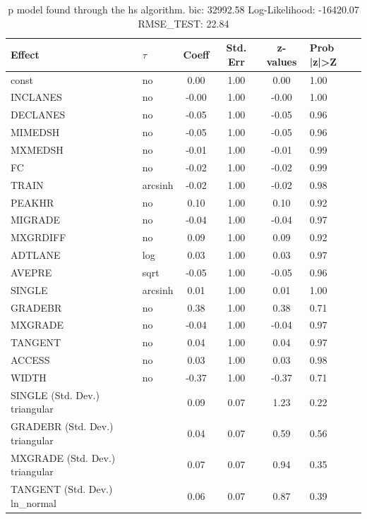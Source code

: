 \begin{table}
	\caption{p model found through the hs algorithm. bic: 32992.58 Log-Likelihood: -16420.07 RMSE_TEST: 22.84}
	\begin{center}
		\begin{tabular}{|l|l|c|c|c|l|}
			\hline
			Effect & $\tau$ & Coeff & Std. Err & z-values & Prob |z|>Z \\
			\hline
			const & no & 0.00 & 1.00 & 0.00 & 1.00 \\
			\hline
			INCLANES & no & -0.00 & 1.00 & -0.00 & 1.00 \\
			\hline
			DECLANES & no & -0.05 & 1.00 & -0.05 & 0.96 \\
			\hline
			MIMEDSH & no & -0.05 & 1.00 & -0.05 & 0.96 \\
			\hline
			MXMEDSH & no & -0.01 & 1.00 & -0.01 & 0.99 \\
			\hline
			FC & no & -0.02 & 1.00 & -0.02 & 0.99 \\
			\hline
			TRAIN & arcsinh & -0.02 & 1.00 & -0.02 & 0.98 \\
			\hline
			PEAKHR & no & 0.10 & 1.00 & 0.10 & 0.92 \\
			\hline
			MIGRADE & no & -0.04 & 1.00 & -0.04 & 0.97 \\
			\hline
			MXGRDIFF & no & 0.09 & 1.00 & 0.09 & 0.92 \\
			\hline
			ADTLANE & log & 0.03 & 1.00 & 0.03 & 0.97 \\
			\hline
			AVEPRE & sqrt & -0.05 & 1.00 & -0.05 & 0.96 \\
			\hline
			SINGLE & arcsinh & 0.01 & 1.00 & 0.01 & 1.00 \\
			\hline
			GRADEBR & no & 0.38 & 1.00 & 0.38 & 0.71 \\
			\hline
			MXGRADE & no & -0.04 & 1.00 & -0.04 & 0.97 \\
			\hline
			TANGENT & no & 0.04 & 1.00 & 0.04 & 0.97 \\
			\hline
			ACCESS & no & 0.03 & 1.00 & 0.03 & 0.98 \\
			\hline
			WIDTH & no & -0.37 & 1.00 & -0.37 & 0.71 \\
			\hline
			SINGLE (Std. Dev.) triangular &  & 0.09 & 0.07 & 1.23 & 0.22 \\
			\hline
			GRADEBR (Std. Dev.) triangular &  & 0.04 & 0.07 & 0.59 & 0.56 \\
			\hline
			MXGRADE (Std. Dev.) triangular &  & 0.07 & 0.07 & 0.94 & 0.35 \\
			\hline
			TANGENT (Std. Dev.) ln_normal &  & 0.06 & 0.07 & 0.87 & 0.39 \\

\end{tabular}
\end{center}
\end{table}
